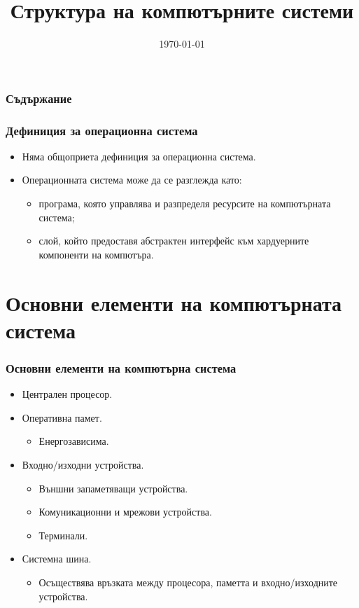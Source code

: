 \documentclass[ignorenonframetext, hyperref=unicode]{beamer}
\title[Структура на КС]{Структура на компютърните системи} \lubo
\date{\today}
\begin{document}
\frame{\maketitle}

\begin{frame}
\frametitle{Съдържание}
\tableofcontents %
\end{frame}

\begin{frame}
\frametitle{Дефиниция за операционна система}
\begin{itemize}
\item Няма общоприета дефиниция за операционна система.
\item Операционната система може да се разглежда като:
\begin{itemize}
\item програма, която управлява и разпределя ресурсите на компютърната
система;
\item слой, който предоставя абстрактен интерфейс към хардуерните компоненти на
компютъра.
\end{itemize}
\end{itemize}
\end{frame}

\section{Основни елементи на компютърната система}

\begin{frame}
\frametitle{Основни елементи на компютърна система}
\begin{itemize}
\item Централен процесор.
\item Оперативна памет.
\begin{itemize}
  \item Енергозависима.
\end{itemize}
\item Входно/изходни устройства.
\begin{itemize}
  \item Външни запаметяващи устройства.
  \item Комуникационни и мрежови устройства.
  \item Терминали.
\end{itemize}
\item Системна шина.
\begin{itemize}
  \item Осъществява връзката между процесора, паметта и входно/изходните
  устройства.
\end{itemize}
\end{itemize}
\end{frame}
\end{document}
